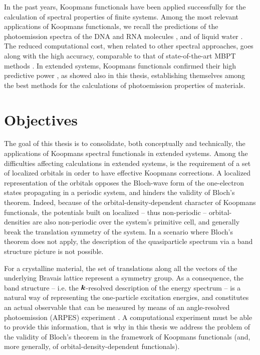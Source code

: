 In the past years, Koopmans functionals have been applied successfully for the calculation of spectral properties of finite systems. Among the most relevant applications of Koopmans functionals, we recall the predictions of the photoemission spectra of the DNA and RNA molecules \cite{nguyen_first-principles_2016}, and of liquid water \cite{de_almeida_electronic_2021}. The reduced computational cost, when related to other spectral approaches, goes along with the high accuracy, comparable to that of state-of-the-art MBPT methods \cite{colonna_koopmans-compliant_2019}. In extended systems, Koopmans functionals confirmed their high predictive power \cite{nguyen_koopmans-compliant_2018,de_gennaro_blochs_2022,colonna_koopmans_2022}, as showed also in this thesis, establishing themselves among the best methods for the calculations of photoemission properties of materials.

\section{Objectives\label{sec:objectives}}
The goal of this thesis is to consolidate, both conceptually and technically, the applications of Koopmans spectral functionals in extended systems. Among the difficulties affecting calculations in extended systems, is the requirement of a set of localized orbitals in order to have effective Koopmans corrections. A localized representation of the orbitals opposes the Bloch-wave form of the one-electron states propagating in a periodic system, and hinders the validity of Bloch's theorem. Indeed, because of the orbital-density-dependent character of Koopmans functionals, the potentials built on localized -- thus non-periodic -- orbital-densities are also non-periodic over the system's primitive cell, and generally break the translation symmetry of the system. In a scenario where Bloch's theorem does not apply, the description of the quasiparticle spectrum via a band structure picture is not possible.

For a crystalline material, the set of translations along all the vectors of the underlying Bravais lattice represent a symmetry group. As a consequence, the band structure -- i.e. the ${\bm k}$-resolved description of the energy spectrum -- is a natural way of representing the one-particle excitation energies, and constitutes an actual observable that can be measured by means of an angle-resolved photoemission (ARPES) experiment \cite{damascelli_angle-resolved_2003}. A computational experiment must be able to provide this information, that is why in this thesis we address the problem of the validity of Bloch's theorem in the framework of Koopmans functionals (and, more generally, of orbital-density-dependent functionals).

